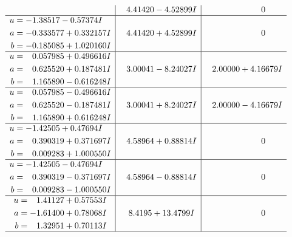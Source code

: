 \documentclass[1p]{elsarticle_modified}
\theoremstyle{definition}
\begin{document}
$$\begin{array}{c|c|c}
 & \phantom{-}4.41420 - 4.52899 I & \phantom{-0.000000 } 0 \\ \hline\begin{aligned}
u &= -1.38517 - 0.57374 I \\
a &= -0.333577 + 0.332157 I \\
b &= -0.185085 + 1.020160 I\end{aligned}
 & \phantom{-}4.41420 + 4.52899 I & \phantom{-0.000000 } 0 \\ \hline\begin{aligned}
u &= \phantom{-}0.057985 + 0.496616 I \\
a &= \phantom{-}0.625520 + 0.187481 I \\
b &= \phantom{-}1.165890 - 0.616248 I\end{aligned}
 & \phantom{-}3.00041 - 8.24027 I & \phantom{-}2.00000 + 4.16679 I \\ \hline\begin{aligned}
u &= \phantom{-}0.057985 - 0.496616 I \\
a &= \phantom{-}0.625520 - 0.187481 I \\
b &= \phantom{-}1.165890 + 0.616248 I\end{aligned}
 & \phantom{-}3.00041 + 8.24027 I & \phantom{-}2.00000 - 4.16679 I \\ \hline\begin{aligned}
u &= -1.42505 + 0.47694 I \\
a &= \phantom{-}0.390319 + 0.371697 I \\
b &= \phantom{-}0.009283 + 1.000550 I\end{aligned}
 & \phantom{-}4.58964 + 0.88814 I & \phantom{-0.000000 } 0 \\ \hline\begin{aligned}
u &= -1.42505 - 0.47694 I \\
a &= \phantom{-}0.390319 - 0.371697 I \\
b &= \phantom{-}0.009283 - 1.000550 I\end{aligned}
 & \phantom{-}4.58964 - 0.88814 I & \phantom{-0.000000 } 0 \\ \hline\begin{aligned}
u &= \phantom{-}1.41127 + 0.57553 I \\
a &= -1.61400 + 0.78068 I \\
b &= \phantom{-}1.32951 + 0.70113 I\end{aligned}
 & \phantom{-}8.4195 + 13.4799 I & \phantom{-0.000000 } 0\\
 \hline 
 \end{array}$$\newpage$$\begin{array}{c|c|c}  

\end{array}$$
\end{document}
